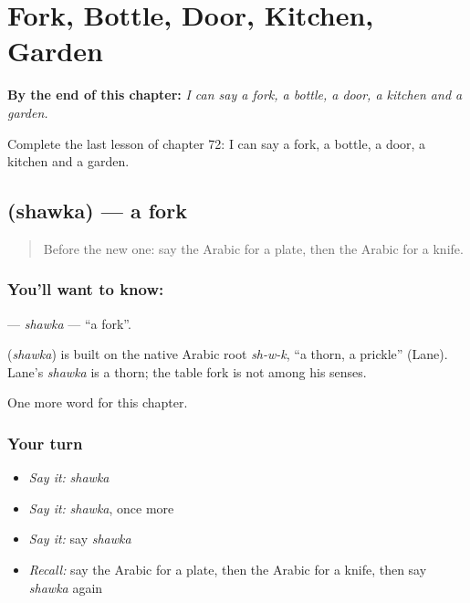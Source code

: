 
\chapter{Fork, Bottle, Door, Kitchen, Garden}
\label{ch:ar-fork-bottle-door-kitchen-garden}

\begin{chapteropening}
\textbf{By the end of this chapter:} \emph{I can say a fork, a bottle, a door, a kitchen and a garden.}

Complete the last lesson of chapter 72: I can say a fork, a bottle, a door, a kitchen and a garden.
\end{chapteropening}

\section[\texorpdfstring{\ar{شوكة} (shawka)}{شوكة (shawka)}]{ (shawka) — a fork}

\label{lesson:AR-C72-shawka}



\begin{quote}
Before the new one: say the Arabic for a plate, then the Arabic for a knife.
\end{quote}

\subsection*{You'll want to know: }
\textbf{} — \emph{shawka} — \textquotedblleft{}a fork\textquotedblright{}.

\begin{cousinweb}
\textbf{} (\emph{shawka}) is built on the native Arabic root \emph{sh-w-k}, \textquotedblleft{}a thorn, a prickle\textquotedblright{} (Lane). Lane's \emph{shawka} is a thorn; the table fork is not among his senses.
\end{cousinweb}

\begin{grammarlens}[title={What you've built}]
One more word for this chapter.
\end{grammarlens}

\subsection*{Your turn}
\begin{itemize}
\raggedright
  \item \emph{Say it:} \emph{shawka}
  \item \emph{Say it:} \emph{shawka}, once more
  \item \emph{Say it:} say \emph{shawka}
  \item \emph{Recall:} say the Arabic for a plate, then the Arabic for a knife, then say \emph{shawka} again
\end{itemize}

